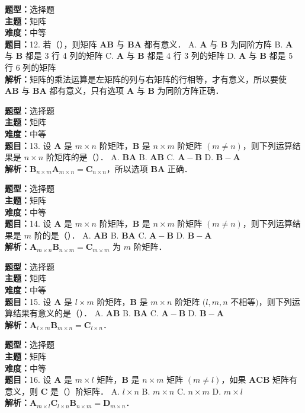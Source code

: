 \documentclass{ctexart}
\newenvironment{question}[5]{%
	\noindent\textbf{题型：}#1\\
	\textbf{主题：}#2\\
	\textbf{难度：}#3\\
	\textbf{题目：}#4\\
	\textbf{解析：}#5\\
	\vspace{1em}
}{}
\begin{document}
	\begin{question}
		{选择题}
		{矩阵}
		{中等}
		{12. 若（），则矩阵 \(\mathbf{A B}\) 与 \(\mathbf{B A}\) 都有意义．
			A. \(\mathbf{A}\) 与 \(\mathbf{B}\) 为同阶方阵
			B. \(\mathbf{A}\) 与 \(\mathbf{B}\) 都是 3 行 4 列的矩阵
			C. \(\mathbf{A}\) 与 \(\mathbf{B}\) 都是 4 行 3 列的矩阵
			D. \(\mathbf{A}\) 与 \(\mathbf{B}\) 都是 5 行 6 列的矩阵}
		{矩阵的乘法运算是左矩阵的列与右矩阵的行相等，才有意义，所以要使 \(\mathbf{A B}\) 与 \(\mathbf{B A}\) 都有意义，只有选项 \(\mathbf{A}\) 与 \(\mathbf{B}\) 为同阶方阵正确．}
	\end{question}
	
	\begin{question}
		{选择题}
		{矩阵}
		{中等}
		{13. 设 \(\mathbf{A}\) 是 \(m \times n\) 阶矩阵，\(\mathbf{B}\) 是 \(n \times m\) 阶矩阵 \((m \neq n)\)，则下列运算结果是 \(n \times n\) 阶矩阵的是（）．
			A. \(\mathbf{B A}\)
			B. \(\mathbf{A B}\)
			C. \(\mathbf{A}-\mathbf{B}\)
			D. \(\mathbf{B}-\mathbf{A}\)}
		{\(\mathbf{B}_{n \times m} \mathbf{A}_{m \times n}=\mathbf{C}_{n \times n}\)，所以选项 \(\mathbf{B A}\) 正确．}
	\end{question}
	
	\begin{question}
		{选择题}
		{矩阵}
		{中等}
		{14. 设 \(\mathbf{A}\) 是 \(m \times n\) 阶矩阵，\(\mathbf{B}\) 是 \(n \times m\) 阶矩阵 \((m \neq n)\)，则下列运算结果是 \(m\) 阶的是（）．
			A. \(\mathbf{A B}\)
			B. \(\mathbf{B A}\)
			C. \(\mathbf{A}-\mathbf{B}\)
			D. \(\mathbf{B}-\mathbf{A}\)}
		{\(\mathbf{A}_{m \times n} \mathbf{B}_{n \times m}=\mathbf{C}_{m \times m}\) 为 \(m\) 阶矩阵．}
	\end{question}
	
	\begin{question}
		{选择题}
		{矩阵}
		{中等}
		{15. 设 \(\mathbf{A}\) 是 \(l \times m\) 阶矩阵，\(\mathbf{B}\) 是 \(m \times n\) 阶矩阵 \((l, m, n\) 不相等\()\)，则下列运算结果有意义的是（）．
			A. \(\mathbf{A B}\)
			B. \(\mathbf{B A}\)
			C. \(\mathbf{A}-\mathbf{B}\)
			D. \(\mathbf{B}-\mathbf{A}\)}
		{\(\mathbf{A}_{l \times m} \mathbf{B}_{m \times n}=\mathbf{C}_{l \times n}\)．}
	\end{question}
	
	\begin{question}
		{选择题}
		{矩阵}
		{中等}
		{16. 设 \(\mathbf{A}\) 是 \(m \times l\) 矩阵，\(\mathbf{B}\) 是 \(n \times m\) 矩阵 \((m \neq l)\)，如果 \(\mathbf{A C B}\) 矩阵有意义，则 \(\mathbf{C}\) 是（）阶矩阵．
			A. \(l \times n\)
			B. \(m \times n\)
			C. \(n \times m\)
			D. \(m \times l\)}
		{\(\mathbf{A}_{m \times l} \mathbf{C}_{l \times n} \mathbf{B}_{n \times m}=\mathbf{D}_{m \times n}\)．}
	\end{question}
	
\end{document}

